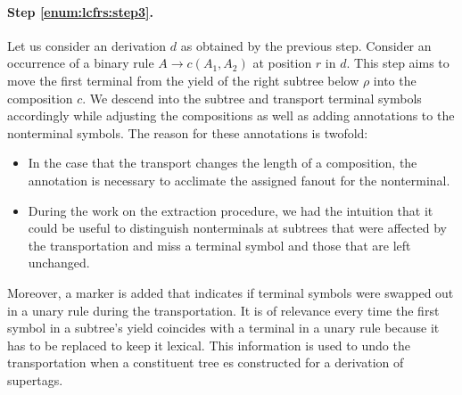 \documentclass[../../document.tex]{subfiles}
\begin{document}
    \paragraph{Step \ref{enum:lcfrs:step3}.}
    Let us consider an  derivation \(d\) as obtained by the previous step.
    Consider an occurrence of a binary rule $A \to c(A_1, A_2)$ at position \(r\) in \(d\).
    This step aims to move the first terminal from the yield of the right subtree below \(\rho\) into the composition \(c\).
    We descend into the subtree and transport terminal symbols accordingly while adjusting the compositions as well as adding annotations to the nonterminal symbols.
    The reason for these annotations is twofold:
    \begin{itemize}
        \item In the case that the transport changes the length of a composition, the annotation is necessary to acclimate the assigned fanout for the  nonterminal.
        \item
            During the work on the extraction procedure, we had the intuition that it could be useful to distinguish nonterminals at subtrees that were affected by the transportation and miss a terminal symbol and those that are left unchanged.
    \end{itemize}
    Moreover, a marker is added that indicates if terminal symbols were swapped out in a unary rule during the transportation.
    It is of relevance every time the first symbol in a subtree's yield coincides with a terminal in a unary rule because it has to be replaced to keep it lexical.
    This information is used to undo the transportation when a constituent tree es constructed for a derivation of supertags.
\end{document}
